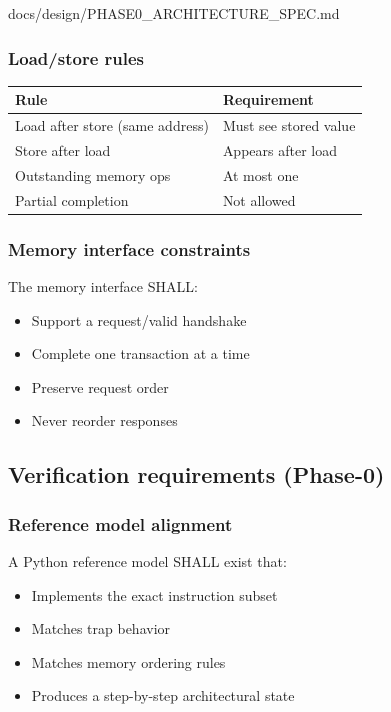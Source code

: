 \begin{relocated}{docs/design/PHASE0_ARCHITECTURE_SPEC.md}
\subsubsection{\texorpdfstring{Load/\allowbreak{}store
rules}{Load/store rules}}\label{ds:ch:phase0-architecture:loadstore-rules}

{
\begin{longtable}[]{@{}ll@{}}
\toprule\noalign{}
Rule & Requirement \\
\midrule\noalign{}
\endhead
\bottomrule\noalign{}
\endlastfoot
Load after store (same address) & Must see stored value \\
Store after load & Appears after load \\
Outstanding memory ops & At most one \\
Partial completion & Not allowed \\
\end{longtable}
}

\subsubsection{Memory interface constraints}\label{ds:ch:phase0-architecture:memory-interface-constraints}

The memory interface SHALL:

\begin{itemize}
\tightlist
\item
  Support a request/\allowbreak{}valid handshake
\item
  Complete one transaction at a time
\item
  Preserve request order
\item
  Never reorder responses
\end{itemize}

\subsection{Verification requirements (Phase-0)}\label{ds:ch:phase0-architecture:verification-requirements-phase-0}

\subsubsection{Reference model alignment}\label{ds:ch:phase0-architecture:reference-model-alignment}

A Python reference model SHALL exist that:

\begin{itemize}
\tightlist
\item
  Implements the exact instruction subset
\item
  Matches trap behavior
\item
  Matches memory ordering rules
\item
  Produces a step-by-step architectural state
\end{itemize}


\end{relocated}
